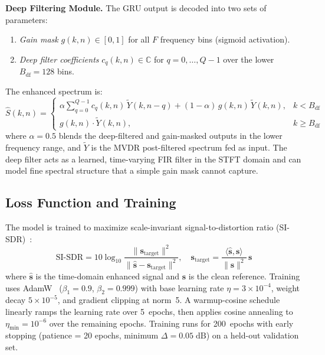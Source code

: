 \documentclass[a4paper]{article}
\begin{document}
\noindent\textbf{Deep Filtering Module.}
The GRU output is decoded into two sets of parameters:
\begin{enumerate}\itemsep0pt
\item \emph{Gain mask} $g(k,n)\in[0,1]$ for all $F$ frequency bins
      (sigmoid activation).
\item \emph{Deep filter coefficients} $c_q(k,n)\in\mathbb{C}$ for
      $q=0,\ldots,Q\!-\!1$ over the lower $B_\text{df}=128$ bins.
\end{enumerate}
The enhanced spectrum is:
\begin{equation}
\hat{S}(k,n) = \begin{cases}
\displaystyle\alpha\sum_{q=0}^{Q-1} c_q(k,n)\,\tilde{Y}(k,n\!-\!q)
+ (1\!-\!\alpha)\,g(k,n)\,\tilde{Y}(k,n),
& k < B_\text{df}\\[6pt]
g(k,n)\cdot\tilde{Y}(k,n), & k \geq B_\text{df}
\end{cases}
\label{eq:deep_filter}
\end{equation}
where $\alpha=0.5$ blends the deep-filtered and gain-masked outputs in the
lower frequency range, and $\tilde{Y}$ is the MVDR post-filtered spectrum fed
as input.  The deep filter acts as a learned, time-varying FIR filter in the
STFT domain and can model fine spectral structure that a simple gain mask
cannot capture.

\subsection{Loss Function and Training}
\label{sec:training}

The model is trained to maximize scale-invariant signal-to-distortion ratio
(SI-SDR)~\cite{leroux2019sdr}:
\begin{equation}
\text{SI-SDR} = 10\log_{10}\frac{\|\mathbf{s}_\text{target}\|^2}
{\|\hat{\mathbf{s}}-\mathbf{s}_\text{target}\|^2},\quad
\mathbf{s}_\text{target} = \frac{\langle\hat{\mathbf{s}},\mathbf{s}\rangle}
{\|\mathbf{s}\|^2}\,\mathbf{s}
\label{eq:sisdr}
\end{equation}
where $\hat{\mathbf{s}}$ is the time-domain enhanced signal and $\mathbf{s}$
is the clean reference.  Training uses AdamW~\cite{loshchilov2019adamw}
($\beta_1\!=\!0.9$, $\beta_2\!=\!0.999$) with base learning rate
$\eta=3\!\times\!10^{-4}$, weight decay $5\!\times\!10^{-5}$, and gradient
clipping at norm~5.  A warmup-cosine schedule linearly ramps the learning
rate over 5~epochs, then applies cosine annealing to $\eta_\text{min}=10^{-6}$
over the remaining epochs.  Training runs for 200~epochs with early stopping
(patience = 20 epochs, minimum $\Delta=0.05\;\text{dB}$) on a held-out
validation set.
\end{document}
